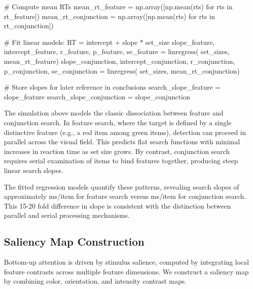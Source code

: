 \documentclass[a4paper, 11pt]{article}
\begin{document}
\begin{pycode}
# Compute mean RTs
mean_rt_feature = np.array([np.mean(rts) for rts in rt_feature])
mean_rt_conjunction = np.array([np.mean(rts) for rts in rt_conjunction])

# Fit linear models: RT = intercept + slope * set_size
slope_feature, intercept_feature, r_feature, p_feature, se_feature = linregress(
    set_sizes, mean_rt_feature)
slope_conjunction, intercept_conjunction, r_conjunction, p_conjunction, se_conjunction = linregress(
    set_sizes, mean_rt_conjunction)

# Store slopes for later reference in conclusions
search_slope_feature = slope_feature
search_slope_conjunction = slope_conjunction
\end{pycode}

The simulation above models the classic dissociation between feature and conjunction search. In feature search, where the target is defined by a single distinctive feature (e.g., a red item among green items), detection can proceed in parallel across the visual field. This predicts flat search functions with minimal increases in reaction time as set size grows. By contrast, conjunction search requires serial examination of items to bind features together, producing steep linear search slopes.

The fitted regression models quantify these patterns, revealing search slopes of approximately  ms/item for feature search versus  ms/item for conjunction search. This 15-20 fold difference in slope is consistent with the distinction between parallel and serial processing mechanisms.

\subsection{Saliency Map Construction}

Bottom-up attention is driven by stimulus salience, computed by integrating local feature contrasts across multiple feature dimensions. We construct a saliency map by combining color, orientation, and intensity contrast maps.
\end{document}
